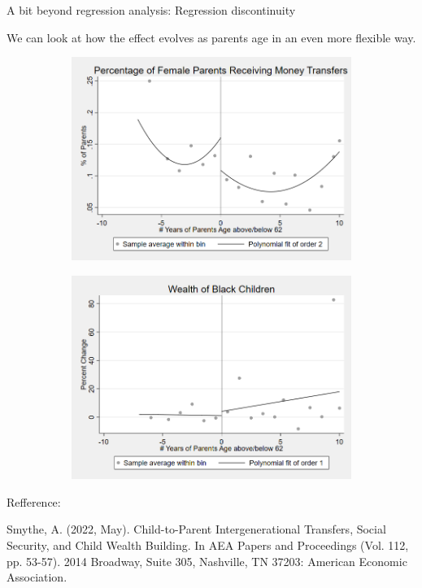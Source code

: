 \documentclass[10pt]{beamer}
\begin{document}
\begin{frame}{A bit beyond regression analysis: Regression discontinuity}

We can look at how the effect evolves as parents age in an even more flexible way. 

\begin{figure}[h!]
\begin{subfigure}[t]{.48\textwidth}
  \includegraphics[width=\textwidth]{RD_Transfer.png}
\end{subfigure}%
\hfill
\begin{subfigure}[t]{.48\textwidth}
  \includegraphics[width=\textwidth]{RD_ChangeWealth.png}
\end{subfigure}%
\end{figure}%
    
\end{frame}

\begin{frame}{Refference:}

Smythe, A. (2022, May). Child-to-Parent Intergenerational Transfers, Social Security, and Child Wealth Building. In AEA Papers and Proceedings (Vol. 112, pp. 53-57). 2014 Broadway, Suite 305, Nashville, TN 37203: American Economic Association.
    
\end{frame}
\end{document}
